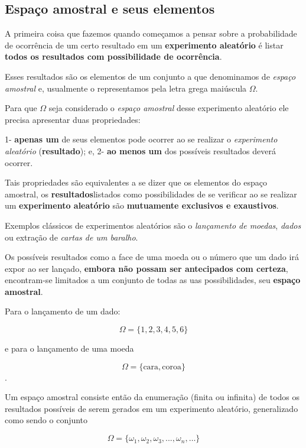 \documentclass[
]{book}
\begin{document}
\hypertarget{espauxe7o-amostral-e-seus-elementos}{%
\subsection{Espaço amostral e seus elementos}\label{espauxe7o-amostral-e-seus-elementos}}

A primeira coisa que fazemos quando começamos a pensar sobre a probabilidade de ocorrência de um certo resultado em um \textbf{experimento aleatório} é listar \textbf{todos os resultados com possibilidade de ocorrência}.

Esses resultados são os elementos de um conjunto a que denominamos de \emph{espaço amostral} e, usualmente o representamos pela letra grega maiúscula \(\Omega\).

Para que \(\Omega\) seja considerado o \emph{espaço amostral} desse experimento aleatório ele precisa apresentar duas propriedades:

1- \textbf{apenas um} de seus elementos pode ocorrer ao se realizar o \emph{experimento aleatório} (\textbf{resultado}); e,
2- \textbf{ao menos um} dos possíveis resultados deverá ocorrer.

Tais propriedades são equivalentes a se dizer que os elementos do espaço amostral, os \textbf{resultados}listados como possibilidades de se verificar ao se realizar um \textbf{experimento aleatório} são \textbf{mutuamente exclusivos e exaustivos}.

Exemplos clássicos de experimentos aleatórios são o \emph{lançamento de moedas}, \emph{dados} ou extração de \emph{cartas de um baralho}.

Os possíveis resultados como a face de uma moeda ou o número que um dado irá expor ao ser lançado, \textbf{embora não possam ser antecipados com certeza}, encontram-se limitados a um conjunto de todas as uas possibilidades, seu \textbf{espaço amostral}.

Para o lançamento de um dado:

\[
\Omega = \{ 1,2,3,4,5,6\}
\]

e para o lançamento de uma moeda

\[\Omega=\{\text{cara}, \text{coroa}\}
\].

Um espaço amostral consiste então da enumeração (finita ou infinita) de todos os resultados possíveis de serem gerados em um experimento aleatório, generalizado como sendo o conjunto

\[
\Omega = \{\omega_{1}, \omega_{2}, \omega_{3}, ..., \omega_{n}, \dots \}
\]
\end{document}
